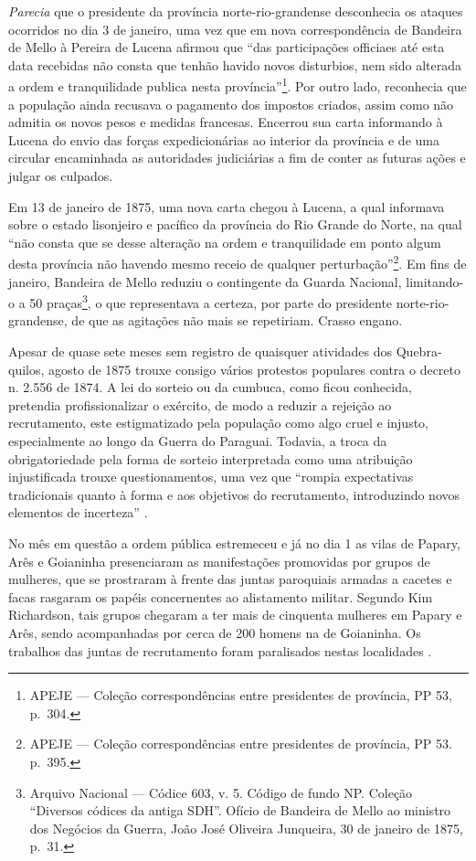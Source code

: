 \begin{refsection}
\textit{Parecia} que o presidente da província norte-rio-grandense desconhecia os ataques ocorridos no dia 3 de janeiro, uma vez que em nova correspondência de Bandeira de Mello à Pereira de Lucena afirmou que “das participações officiaes até esta data recebidas não consta que tenhão havido novos disturbios, nem sido alterada a ordem e tranquilidade publica nesta província”\footnote{APEJE --- Coleção correspondências entre presidentes de província, PP 53, p.~304.}. Por outro lado, reconhecia que a população ainda recusava o pagamento dos impostos criados, assim como não admitia os novos pesos e medidas francesas. Encerrou sua carta informando à Lucena do envio das forças expedicionárias ao interior da província e de uma circular encaminhada as autoridades judiciárias a fim de conter as futuras ações e julgar os culpados. 

Em 13 de janeiro de 1875, uma nova carta chegou à Lucena, a qual informava sobre o estado lisonjeiro e pacífico da província do Rio Grande do Norte, na qual “não consta que se desse alteração na ordem e tranquilidade em ponto algum desta província não havendo mesmo receio de qualquer perturbação”\footnote{APEJE --- Coleção correspondências entre presidentes de província, PP 53. p.~395.}. Em fins de janeiro, Bandeira de Mello reduziu o contingente da Guarda Nacional, limitando-o a 50 praças\footnote{Arquivo Nacional --- Códice 603, v. 5. Código de fundo NP. Coleção “Diversos códices da antiga SDH”. Ofício de Bandeira de Mello ao ministro dos Negócios da Guerra, João José Oliveira Junqueira, 30 de janeiro de 1875, p.~31.}, o que representava a certeza, por parte do presidente norte-rio-grandense, de que as agitações não mais se repetiriam. Crasso engano. 

Apesar de quase sete meses sem registro de quaisquer atividades dos Quebra-quilos, agosto de 1875 trouxe consigo vários protestos populares contra o decreto n. 2.556 de 1874. A lei do sorteio ou da cumbuca, como ficou conhecida, pretendia profissionalizar o exército, de modo a reduzir a rejeição ao recrutamento, este estigmatizado pela população como algo cruel e injusto, especialmente ao longo da Guerra do Paraguai. Todavia, a troca da obrigatoriedade pela forma de sorteio interpretada como uma atribuição injustificada trouxe questionamentos, uma vez que “rompia expectativas tradicionais quanto à forma e aos objetivos do recrutamento, introduzindo novos elementos de incerteza” \cite[p.~270]{Mendes1999}.

No mês em questão a ordem pública estremeceu e já no dia 1 as vilas de Papary, Arês e Goianinha presenciaram as manifestações promovidas por grupos de mulheres, que se prostraram à frente das juntas paroquiais armadas a cacetes e facas rasgaram os papéis concernentes ao alistamento militar. Segundo Kim Richardson, tais grupos chegaram a ter mais de cinquenta mulheres em Papary e Arês, sendo acompanhadas por cerca de 200 homens na de Goianinha. Os trabalhos das juntas de recrutamento foram paralisados nestas localidades \cite[p.~133]{Richardson2008}.


\end{refsection}
